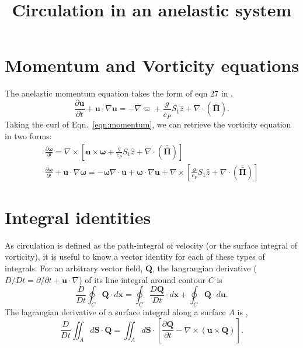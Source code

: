 \documentclass[onecolumn, amsmath, amsfonts, amssymb]{aastex62}
\newcommand{\Div}[1]{\ensuremath{\nabla\cdot\left( #1\right)}}
\newcommand{\DivU}{\ensuremath{\nabla\cdot\bm{u}}}
\newcommand{\grad}{\ensuremath{\nabla}}
\newcommand{\stressT}{\ensuremath{\bm{\bar{\bar{\Pi}}}}}
\begin{document}
\title{Circulation in an anelastic system}
\section{Momentum and Vorticity equations}
The anelastic momentum equation takes the form of eqn 27 in \cite{lecoanet&all2014},
\begin{equation}
\frac{\partial \bm{u}}{\partial t} + \bm{u}\cdot\grad\bm{u}
= -\grad \varpi + \frac{g}{c_P} S_1 \hat{z} + \Div{\stressT}.
\label{eqn:momentum}
\end{equation}
Taking the curl of Eqn.~\ref{eqn:momentum}, we can retrieve the vorticity equation in two
forms:
\begin{gather}
\frac{\partial \bm{\omega}}{\partial t}
= \nabla \times \left[ \bm{u}\times\bm{\omega} + \frac{g}{c_P} S_1 \hat{z} + \Div{\stressT}  \right]
\label{eqn:vorticity_1}
\\
\frac{\partial \bm{\omega}}{\partial t} + \bm{u}\cdot\grad\bm{\omega}
= -\bm{\omega}\DivU + \bm{\omega}\cdot\grad\bm{u} 
+ \nabla \times \left[ \frac{g}{c_P} S_1 \hat{z} + \Div{\stressT}  \right]
\label{eqn:vorticity_2}
\end{gather}

\section{Integral identities}
As circulation is defined as the path-integral of velocity (or the surface integral of
vorticity), it is useful to know a vector identity for each of these types of integrals.
For an arbitrary vector field, $\bm{Q}$, the langrangian derivative
($D/Dt = \partial/\partial t + \bm{u}\cdot\grad$) of its line integral around contour $C$ is
\begin{equation}
\frac{D}{Dt}\oint_C \bm{Q}\cdot d\bm{x} 
= \oint_C\frac{D \bm{Q}}{D t}\cdot d\bm{x} + \oint_C\bm{Q} \cdot d\bm{u}.
\label{eqn:line_integral}
\end{equation}
The lagrangian derivative of a surface integral along a surface $A$ is
\citep[Eqn.~4.45 of][]{choudhuri1998},
\begin{equation}
\frac{D}{Dt}\iint_A d\bm{S}\cdot\bm{Q}
= \iint_A d\bm{S}\cdot\left[\frac{\partial \bm{Q}}{\partial t} - \grad\times(\bm{u}\times\bm{Q})\right].
\label{eqn:area_integral}
\end{equation}
\end{document}

